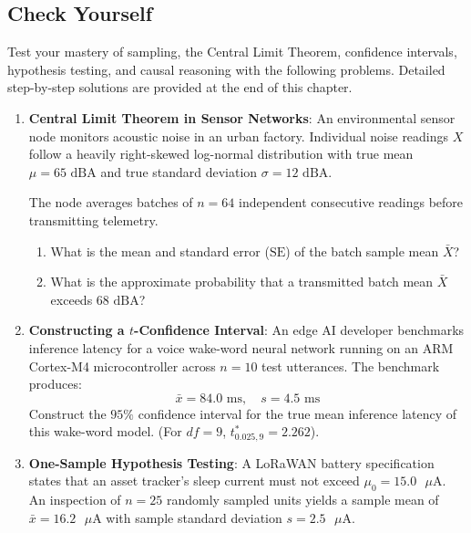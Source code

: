 \subsection{Check Yourself}\label{subsec:stat_check_yourself}

Test your mastery of sampling, the Central Limit Theorem, confidence intervals, hypothesis testing, and causal reasoning with the following problems. Detailed step-by-step solutions are provided at the end of this chapter.

\begin{checkyourself}
\begin{enumerate}
    \item \textbf{Central Limit Theorem in Sensor Networks}:
    An environmental sensor node monitors acoustic noise in an urban factory. Individual noise readings $X$ follow a heavily right-skewed log-normal distribution with true mean $\mu = 65\text{ dBA}$ and true standard deviation $\sigma = 12\text{ dBA}$.
    
    The node averages batches of $n = 64$ independent consecutive readings before transmitting telemetry.
    \begin{enumerate}[label=(\alph*)]
        \item What is the mean and standard error ($\text{SE}$) of the batch sample mean $\bar{X}$?
        \item What is the approximate probability that a transmitted batch mean $\bar{X}$ exceeds $68\text{ dBA}$?
    \end{enumerate}

    \item \textbf{Constructing a $t$-Confidence Interval}:
    An edge AI developer benchmarks inference latency for a voice wake-word neural network running on an ARM Cortex-M4 microcontroller across $n = 10$ test utterances. The benchmark produces:
    \begin{equation*}
    \bar{x} = 84.0\text{ ms}, \quad s = 4.5\text{ ms}
    \end{equation*}
    Construct the $95\%$ confidence interval for the true mean inference latency of this wake-word model. (For $df = 9$, $t_{0.025, 9}^* = 2.262$).

    \item \textbf{One-Sample Hypothesis Testing}:
    A LoRaWAN battery specification states that an asset tracker's sleep current must not exceed $\mu_0 = 15.0\text{ }\mu\text{A}$. An inspection of $n = 25$ randomly sampled units yields a sample mean of $\bar{x} = 16.2\text{ }\mu\text{A}$ with sample standard deviation $s = 2.5\text{ }\mu\text{A}$.
    

\end{enumerate}
\end{checkyourself}
